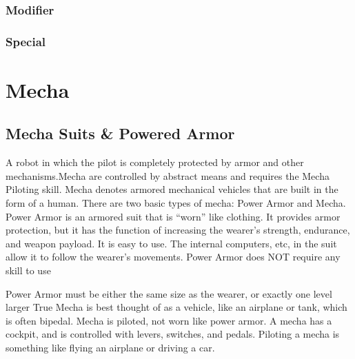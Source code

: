 \documentclass[twoside]{book}
\begin{document}
\subsection{Modifier}
    
\subsection{Special}
    
\chapter{Mecha}
    
\section{Mecha Suits \& Powered Armor}
      A robot in which the pilot is completely protected by
             armor and other mechanisms.Mecha are controlled by abstract
             means and requires the Mecha Piloting skill.   Mecha denotes armored mechanical vehicles that are
             built in the form of a human. There are two basic types of
             mecha: Power Armor and Mecha.   Power Armor is an armored suit that is
             “worn” like clothing. It provides armor
             protection, but it has the function of increasing the
             wearer’s strength, endurance, and weapon payload. It
             is easy to use. The internal computers, etc, in the suit
             allow it to follow the wearer’s movements.   
               Power Armor does NOT require any skill to use
               
               Power Armor must be either the same size as the
               wearer, or exactly one level larger 
            True Mecha is best thought of as a vehicle, like an
             airplane or tank, which is often bipedal. Mecha is piloted,
             not worn like power armor. A mecha has a cockpit, and is
             controlled with levers, switches, and pedals. Piloting a
             mecha is something like flying an airplane or driving a car.
               
\end{document}
